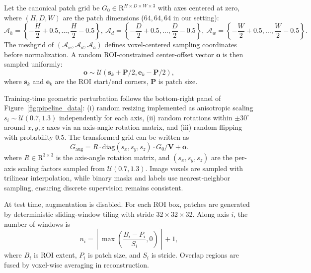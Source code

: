 \documentclass{iopjournal}
\begin{document}
Let the canonical patch grid be $G_0\in\mathrm{R}^{H\times D\times W\times 3}$ with axes centered at zero, where $(H,D,W)$ are the patch dimensions ($64,64,64$ in our setting):
\begin{equation}
\mathcal{A}_h = \left\{-\frac{H}{2}+0.5,\ldots,\frac{H}{2}-0.5\right\},\ 
\mathcal{A}_d = \left\{-\frac{D}{2}+0.5,\ldots,\frac{D}{2}-0.5\right\},\ 
\mathcal{A}_w = \left\{-\frac{W}{2}+0.5,\ldots,\frac{W}{2}-0.5\right\}.
\end{equation}
The meshgrid of $(\mathcal{A}_w,\mathcal{A}_d,\mathcal{A}_h)$ defines voxel-centered sampling coordinates before normalization. A random ROI-constrained center-offset vector $\mathbf{o}$ is then sampled uniformly:
\begin{equation}
\mathbf{o}\sim \mathcal{U}\left(\mathbf{s}_k+\mathbf{P}/2,\mathbf{e}_k-\mathbf{P}/2\right),
\end{equation}
where $\mathbf{s}_k$ and $\mathbf{e}_k$ are the ROI start/end corners, $\mathbf{P}$ is patch size.

Training-time geometric perturbation follows the bottom-right panel of Figure~\ref{fig:pipeline_data}: (i) random resizing implemented as anisotropic scaling $s_i\sim\mathcal{U}(0.7,1.3)$ independently for each axis, (ii) random rotations within $\pm 30^\circ$ around $x,y,z$ axes via an axis-angle rotation matrix, and (iii) random flipping with probability 0.5. The transformed grid can be written as
\begin{equation}
G_{\mathrm{aug}} = R\cdot \mathrm{diag}(s_x,s_y,s_z)\cdot G_0/\mathbf{V} + \mathbf{o}.
\end{equation}
where $R\in\mathrm{R}^{3\times 3}$ is the axis-angle rotation matrix, and $(s_x,s_y,s_z)$ are the per-axis scaling factors sampled from $\mathcal{U}(0.7,1.3)$.
Image voxels are sampled with trilinear interpolation, while binary masks and labels use nearest-neighbor sampling, ensuring discrete supervision remains consistent.

At test time, augmentation is disabled. For each ROI box, patches are generated by deterministic sliding-window tiling with stride 32\,$\times$\,32\,$\times$\,32. Along axis $i$, the number of windows is
\begin{equation}
n_i = \left\lceil \max\left(\frac{B_i-P_i}{S_i},0\right)\right\rceil + 1,
\end{equation}
where $B_i$ is ROI extent, $P_i$ is patch size, and $S_i$ is stride. Overlap regions are fused by voxel-wise averaging in reconstruction.
\end{document}
